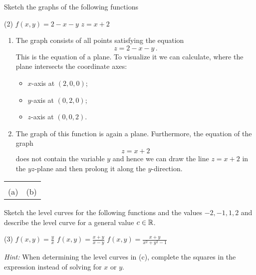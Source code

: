 \begin{question}
Sketch the graphs of the following functions
\begin{tasks}(2)
\task
$f(x,y) = 2-x-y$
\task
$z=x+2$
\end{tasks}
\end{question}

\begin{solution}
\begin{enumerate}
\item
The graph consists of all points satisfying the equation
\[
z=2-x-y\,.
\]
This is the equation of a plane. To visualize it we can calculate, where the plane intersects the coordinate axes:
\begin{itemize}
\item
$x$-axis at $(2,0,0)$;
\item
$y$-axis at $(0,2,0)$;
\item
$z$-axis at $(0,0,2)$.
\end{itemize}

\item
The graph of this function is again a plane. Furthermore, the equation of the graph
\[
z = x+2
\]
does not contain the variable $y$ and hence we can draw the line $z=x+2$ in the $yz$-plane and then prolong it along the $y$-direction.
\end{enumerate}

\begin{center}
\begin{tabu} to \linewidth {X[1,c] X[1,c]}
 &
 \\
(a) & (b)
\end{tabu}
\end{center}
\end{solution}

\begin{question}
Sketch the level curves for the following functions and the values $-2, -1, 1, 2$ and describe the level curve for a general value $c \in {\mathbb R}$.
\begin{tasks}(3)
\task
$f(x,y) = \frac{y}{x}$
\task
$f(x,y) = \frac{x+y}{x-y}$
\task
$f(x,y) = \frac{x+y}{x^2+y^2-1}$
\end{tasks}
{\itshape Hint:} When determining the level curves in (c), complete the squares in the expression instead of solving for $x$ or $y$.
\end{question}

